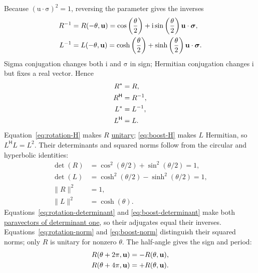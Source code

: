 \documentclass[11pt]{article}
\newcommand{\pv}[1]{{#1}}
\newcommand{\vstyle}[1]{{\bm{\mathrm{#1}}}}
\newcommand{\pL}{\pv{L}}
\newcommand{\pR}{\pv{R}}
\numberwithin{equation}{section}
\newcommand{\ii}{\mathrm{i}}
\newcommand{\dotprod}{\cdot}
\newcommand{\bsig}{\vstyle{\sigma}}
\newcommand{\bu}{\vstyle{u}}
\begin{document}
Because $(\bu\dotprod\bsig)^2=1$, reversing the parameter gives the
inverses
\begin{align}
 \pR^{-1}&=\pR(-\theta,\bu)
 =\cos\left(\frac\theta2\right)+\ii\sin\left(\frac\theta2\right)\bu\dotprod\bsig,
 \notag\\
 \pL^{-1}&=\pL(-\theta,\bu)
 =\cosh\left(\frac\theta2\right)+\sinh\left(\frac\theta2\right)\bu\dotprod\bsig.
 \label{eq:boost-inverse}
\end{align}
Sigma conjugation changes both $\ii$ and $\bsig$ in sign; Hermitian
conjugation changes $\ii$ but fixes a real vector.  Hence
\begin{align}
 \pR^*&=\pR, \notag\\
 \pR^{\mathsf H}&=\pR^{-1}, \label{eq:rotation-H}\\
 \pL^*&=\pL^{-1}, \notag\\
 \pL^{\mathsf H}&=\pL. \label{eq:boost-H}
\end{align}
Equation~\eqref{eq:rotation-H} makes $\pR$
\hyperref[eq:unitary-transform]{unitary}; \eqref{eq:boost-H}
makes $\pL$ Hermitian, so $\pL^{\mathsf H}\pL=\pL^2$.  Their determinants and
squared norms follow from the circular and hyperbolic identities:
\begin{align}
 \det(\pR)&=\cos^2(\theta/2)+\sin^2(\theta/2)=1,
 \label{eq:rotation-determinant}\\
 \det(\pL)&=\cosh^2(\theta/2)-\sinh^2(\theta/2)=1,
 \label{eq:boost-determinant}\\
 \lVert \pR\rVert^2&=1, \label{eq:rotation-norm}\\
 \lVert \pL\rVert^2&=\cosh(\theta). \label{eq:boost-norm}
\end{align}
Equations~\eqref{eq:rotation-determinant} and \eqref{eq:boost-determinant}
make both \hyperref[eq:unit-determinant-paravector]{paravectors of determinant one},
so their adjugates equal their inverses.  Equations~\eqref{eq:rotation-norm}
and \eqref{eq:boost-norm} distinguish their squared norms; only $\pR$ is
unitary for nonzero $\theta$.  The half-angle gives the sign and period:
\begin{align}
 \pR(\theta+2\pi,\bu)&=-\pR(\theta,\bu),
 \label{eq:rotation-two-pi}\\
 \pR(\theta+4\pi,\bu)&=+\pR(\theta,\bu).
 \notag
\end{align}
\end{document}

